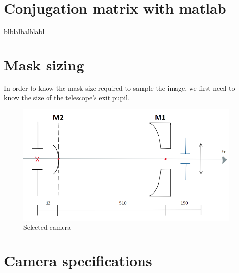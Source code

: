 \section{Conjugation matrix with matlab}
blblalbalblabl
\section{Mask sizing}\label{sec:Opti_Couille}
In order to know the mask size required to sample the image, we first need to know the size of the telescope's exit pupil.
\begin{figure}[H]
    \centering
    \includegraphics[scale=0.55]{assets/figures/Optical Design/Design_Mask.png}
    \caption{Selected camera}
    \label{fig:Opti_Mask_Diagram}
\end{figure}
\section{Camera specifications}\label{sec:Opti_Cam}
